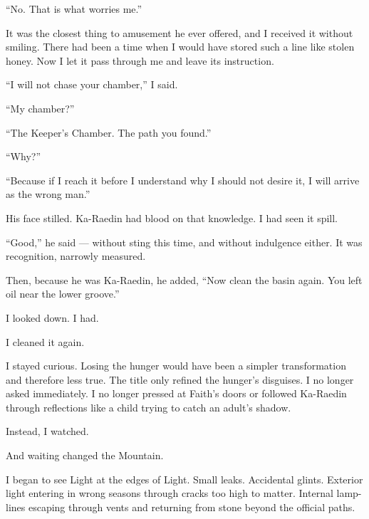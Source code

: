 ``No. That is what worries me.''\par

It was the closest thing to amusement he ever offered, and I received it without smiling. There had been a time when I would have stored such a line like stolen honey. Now I let it pass through me and leave its instruction.\par

``I will not chase your chamber,'' I said.\par

``My chamber?''\par

``The Keeper's Chamber. The path you found.''\par

``Why?''\par

``Because if I reach it before I understand why I should not desire it, I will arrive as the wrong man.''\par

His face stilled. Ka-Raedin had blood on that knowledge. I had seen it spill.\par

``Good,'' he said --- without sting this time, and without indulgence either. It was recognition, narrowly measured.\par

Then, because he was Ka-Raedin, he added, ``Now clean the basin again. You left oil near the lower groove.''\par

I looked down. I had.\par

I cleaned it again.\par

I stayed curious. Losing the hunger would have been a simpler transformation and therefore less true. The title only refined the hunger's disguises. I no longer asked immediately. I no longer pressed at Faith's doors or followed Ka-Raedin through reflections like a child trying to catch an adult's shadow.\par

Instead, I watched.\par

And waiting changed the Mountain.\par

I began to see Light at the edges of Light. Small leaks. Accidental glints. Exterior light entering in wrong seasons through cracks too high to matter. Internal lamp-lines escaping through vents and returning from stone beyond the official paths.\par

